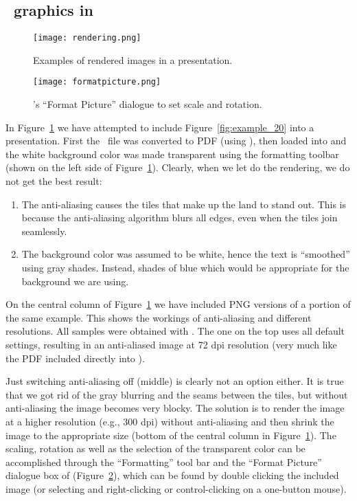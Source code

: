 \subsection{\gmt\ graphics in \protect{}}
\begin{figure}[b]
   \texttt{[image: rendering.png]}
   \caption{Examples of rendered images in a \protect{} presentation.}
   \label{fig:rendering}
\end{figure}
\begin{figure}[b]
   \centering
   \texttt{[image: formatpicture.png]}
   \caption{\protect{}'s ``Format Picture'' dialogue to set scale and rotation.}
   \label{fig:formatpicture}
\end{figure}

In Figure~\ref{fig:rendering} we have attempted to include Figure~\ref{fig:example_20} into a  presentation. First the \PS\ file was converted to PDF (using ), then loaded into  and the white background color was made transparent using the formatting toolbar (shown on the left side of Figure~\ref{fig:rendering}). Clearly, when we let  do the rendering, we do not get the best result:
\begin{enumerate}
\item The anti-aliasing causes the tiles that make up the land to stand out. This is because the anti-aliasing algorithm blurs all edges, even when the tiles join seamlessly.
\item The background color was assumed to be white, hence the text is ``smoothed'' using gray shades. Instead, shades of blue which would be appropriate for the background we are using.
\end{enumerate}

On the central column of Figure~\ref{fig:rendering} we have included PNG versions of a portion of the same example. This shows the workings of anti-aliasing and different resolutions. All samples were obtained with . The one on the top uses all default settings, resulting in an anti-aliased image at 72 dpi resolution (very much like the PDF included directly into ).

Just switching anti-aliasing off (middle) is clearly not an option either. It is true that we got rid of the gray blurring and the seams between the tiles, but without anti-aliasing the image becomes very blocky. The solution is to render the image at a higher resolution (e.g., 300 dpi) without anti-aliasing and then shrink the image to the appropriate size (bottom of the central column in Figure~\ref{fig:rendering}). The scaling, rotation as well as the selection of the transparent color can be accomplished through the ``Formatting'' tool bar and the ``Format Picture'' dialogue box of  (Figure~\ref{fig:formatpicture}), which can be found by double clicking the included image (or selecting and right-clicking or control-clicking on a one-button mouse).

